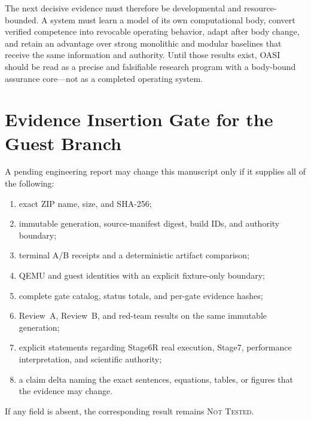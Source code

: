 \documentclass[journal,10pt]{IEEEtran}
\newcommand{\OASI}{\textsc{OASI}}
\newcommand{\NotTested}{\textsc{Not Tested}}
\begin{document}
The next decisive evidence must therefore be developmental and resource-bounded. A system must learn a model of its own computational body, convert verified competence into revocable operating behavior, adapt after body change, and retain an advantage over strong monolithic and modular baselines that receive the same information and authority. Until those results exist, \OASI{} should be read as a precise and falsifiable research program with a body-bound assurance core---not as a completed operating system.

\section{Evidence Insertion Gate for the Guest Branch}
A pending engineering report may change this manuscript only if it supplies all of the following:
\begin{enumerate}
  \item exact ZIP name, size, and SHA-256;
  \item immutable generation, source-manifest digest, build IDs, and authority boundary;
  \item terminal A/B receipts and a deterministic artifact comparison;
  \item QEMU and guest identities with an explicit fixture-only boundary;
  \item complete gate catalog, status totals, and per-gate evidence hashes;
  \item Review~A, Review~B, and red-team results on the same immutable generation;
  \item explicit statements regarding Stage6R real execution, Stage7, performance interpretation, and scientific authority;
  \item a claim delta naming the exact sentences, equations, tables, or figures that the evidence may change.
\end{enumerate}
If any field is absent, the corresponding result remains \NotTested{}.
\end{document}
